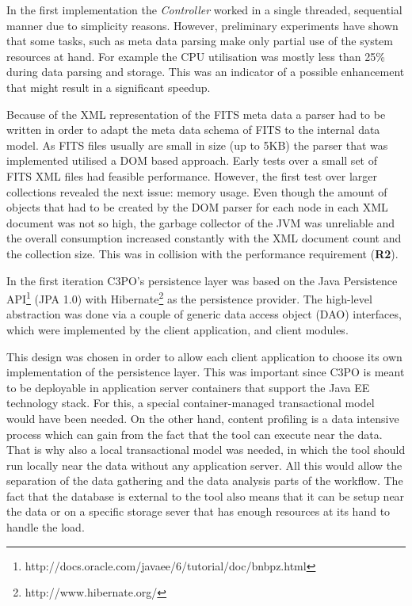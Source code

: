 In the first implementation the \textit{Controller} worked in a single threaded, sequential manner due to simplicity reasons. However, preliminary experiments have shown that some tasks, such as meta data parsing make only partial use of the system resources at hand. For example the CPU utilisation was mostly less than 25\% during data parsing and storage. This was an indicator of a possible enhancement that might result in a significant speedup.

Because of the XML representation of the FITS meta data a parser had to be written in order to adapt the meta data schema of FITS to the internal data model. As FITS files usually are small in size (up to 5KB) the parser that was implemented utilised a DOM based approach. Early tests over a small set of FITS XML files had feasible performance. However, the first test over larger collections revealed the next issue: memory usage. Even though the amount of objects that had to be created by the DOM parser for each node in each XML document was not so high, the garbage collector of the JVM was unreliable and the overall consumption increased constantly with the XML document count and the collection size. This was in collision with the performance requirement (\textbf{R2}).

In the first iteration C3PO's persistence layer was based on the Java Persistence API\footnote{http://docs.oracle.com/javaee/6/tutorial/doc/bnbpz.html} (JPA 1.0) with Hibernate\footnote{http://www.hibernate.org/} as the persistence provider. The high-level abstraction was done via a couple of generic data access object (DAO) interfaces, which were implemented by the client application, and client modules.

This design was chosen in order to allow each client application to choose its own implementation of the persistence layer. This was important since C3PO is meant to be deployable in application server containers that support the Java EE technology stack. For this, a special container-managed transactional model would have been needed. On the other hand, content profiling is a data intensive process which can gain from the fact that the tool can execute near the data. That is why also a local transactional model was needed, in which the tool should run locally near the data without any application server. All this would allow the separation of the data gathering and the data analysis parts of the workflow. The fact that the database is external to the tool also means that it can be setup near the data or on a specific storage sever that has enough resources at its hand to handle the load.

